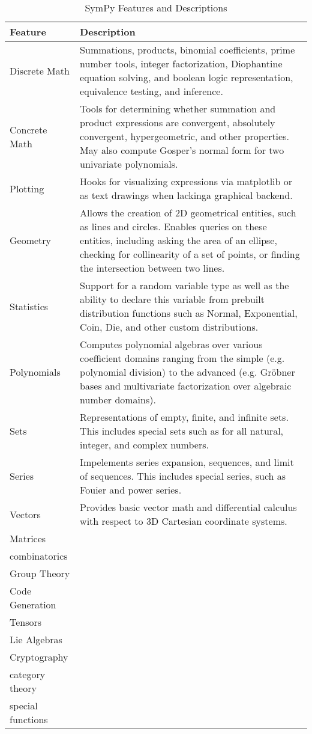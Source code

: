 
\begin{table}
\label{features-table}
\caption{SymPy Features and Descriptions}
\begin{tabular}[htbc]{|l|l|}
\hline
\textbf{Feature} & \textbf{Description} \\
\hline
Discrete Math & Summations, products, binomial coefficients, prime number
    tools, integer factorization, Diophantine equation solving, and
    boolean logic representation, equivalence testing, and inference.\\
Concrete Math & Tools for determining whether summation and product
    expressions are convergent, absolutely convergent, hypergeometric, and
    other properties. May also compute Gosper's normal form
    \cite{petkovvsek1996bak} for two univariate polynomials.\\
Plotting & Hooks for visualizing expressions via matplotlib \cite{Hunter:2007}
    or as text drawings when lackinga graphical backend.\\
Geometry & Allows the creation of 2D geometrical entities,
    such as lines and circles. Enables queries on these entities, including
    asking the area of an ellipse, checking for collinearity of a set of
    points, or finding the intersection between two lines.\\
Statistics & Support for a random variable type as well as the ability to
    declare this variable from prebuilt distribution functions such as
    Normal, Exponential, Coin, Die, and other custom distributions.\\
Polynomials & Computes polynomial algebras over various coefficient domains
    ranging from the simple (e.g. polynomial division) to the advanced
    (e.g. Gr\"obner bases \cite{adams1994introduction} and multivariate
    factorization over algebraic number domains).\\
Sets & Representations of empty, finite, and infinite sets. This includes
    special sets such as for all natural, integer, and complex numbers.\\
Series & Impelements series expansion, sequences, and limit of sequences.
    This includes special series, such as Fouier and power series.\\
Vectors & Provides basic vector math and differential calculus with respect
    to 3D Cartesian coordinate systems.\\
Matrices & \\
combinatorics & \\
Group Theory & \\
Code Generation & \\
Tensors & \\
Lie Algebras & \\
Cryptography & \\
category theory & \\
special functions & \\
\hline
\end{tabular}
\end{table}


